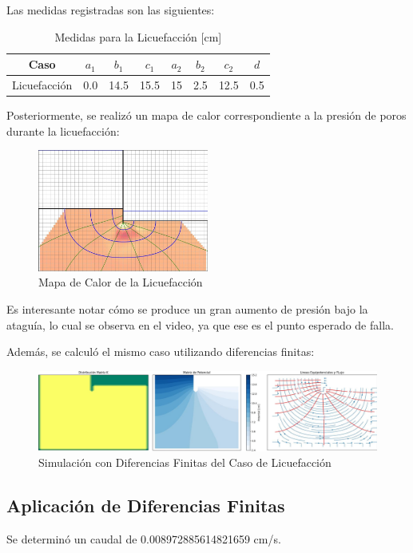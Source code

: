 Las medidas registradas son las siguientes:

\begin{table}[H]
    \centering
    \begin{tabular}{|c|c|c|c|c|c|c|c|}
    \hline
    Caso & $a_1$ & $b_1$ & $c_1$ & $a_2$ & $b_2$ & $c_2$ & $d$ \\ \hline
    Licuefacción & 0.0 & 14.5 & 15.5 & 15 & 2.5 & 12.5 & 0.5 \\ \hline
    \end{tabular}
    \caption{Medidas para la Licuefacción [cm]}
    \label{tab:medidas1}
\end{table}

Posteriormente, se realizó un mapa de calor correspondiente a la presión de poros durante la licuefacción:

\begin{figure}[H]
    \centering
    \includegraphics[width=0.5\textwidth]{GRAFICOS/caso_licuefaccion_presion_poros.jpg}
    \caption{Mapa de Calor de la Licuefacción}
    \label{fig:maqueta_licuefaccion}
\end{figure}

Es interesante notar cómo se produce un gran aumento de presión bajo la ataguía, lo cual se observa en el video, ya que ese es el punto esperado de falla.

Además, se calculó el mismo caso utilizando diferencias finitas:

\begin{figure}[H]
    \centering
    \includegraphics[width=1\textwidth]{GRAFICOS/laplace_caso_licuefaccion_escala_cm.jpg}
    \caption{Simulación con Diferencias Finitas del Caso de Licuefacción}
    \label{fig:maqueta_licuefaccion_diferencias_finitas}
\end{figure}

\subsection{Aplicación de Diferencias Finitas}

Se determinó un caudal de 0.008972885614821659 cm/s.
